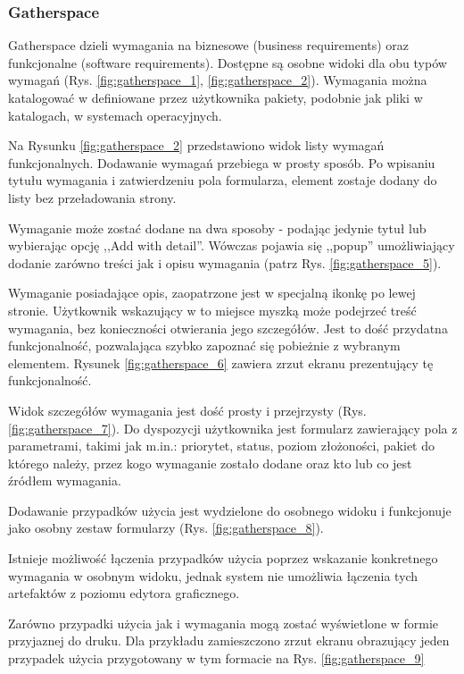       \subsubsection{Gatherspace}
        Gatherspace dzieli wymagania na biznesowe (business requirements) oraz funkcjonalne (software requirements). Dostępne są osobne widoki dla obu typów wymagań (Rys. \ref{fig:gatherspace_1}, \ref{fig:gatherspace_2}). Wymagania można katalogować w definiowane przez użytkownika pakiety, podobnie jak pliki w katalogach, w systemach operacyjnych. 

        Na Rysunku \ref{fig:gatherspace_2} przedstawiono widok listy wymagań funkcjonalnych. Dodawanie wymagań przebiega w prosty sposób. Po wpisaniu tytułu wymagania i zatwierdzeniu pola formularza, element zostaje dodany do listy bez przeładowania strony.

        Wymaganie może zostać dodane na dwa sposoby - podając jedynie tytuł lub wybierając opcję ,,Add with detail''. Wówczas pojawia się ,,popup'' umożliwiający dodanie zarówno treści jak i opisu wymagania (patrz Rys. \ref{fig:gatherspace_5}).

        Wymaganie posiadające opis, zaopatrzone jest w specjalną ikonkę po lewej stronie. Użytkownik wskazujący w to miejsce myszką może podejrzeć treść wymagania, bez konieczności otwierania jego szczegółów. Jest to dość przydatna funkcjonalność, pozwalająca szybko zapoznać się pobieżnie z wybranym elementem. Rysunek \ref{fig:gatherspace_6} zawiera zrzut ekranu prezentujący tę funkcjonalność. 
        
        Widok szczegółów wymagania jest dość prosty i przejrzysty (Rys. \ref{fig:gatherspace_7}). Do dyspozycji użytkownika jest formularz zawierający pola z parametrami, takimi jak m.in.: priorytet, status, poziom złożoności, pakiet do którego należy, przez kogo wymaganie zostało dodane oraz kto lub co jest źródłem wymagania.

        Dodawanie przypadków użycia jest wydzielone do osobnego widoku i funkcjonuje jako osobny zestaw formularzy (Rys. \ref{fig:gatherspace_8}). 

        Istnieje możliwość łączenia przypadków użycia poprzez wskazanie konkretnego wymagania w osobnym widoku, jednak system nie umożliwia łączenia tych artefaktów z poziomu edytora graficznego.

        Zarówno przypadki użycia jak i wymagania mogą zostać wyświetlone w formie przyjaznej do druku. Dla przykładu zamieszczono zrzut ekranu obrazujący jeden przypadek użycia przygotowany w tym formacie na Rys. \ref{fig:gatherspace_9}

